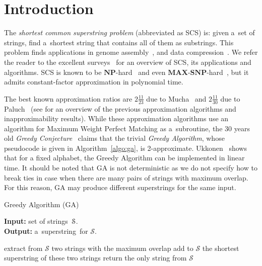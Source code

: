 \section{Introduction}
\label{sec:intro}
The {\em shortest common superstring problem} (abbreviated as SCS) is:
given a~set of strings, find a~shortest string that contains all of them as
substrings. This problem finds applications in genome assembly~\cite{waterman1995introduction, pevzner2001eulerian}, and data compression~\cite{GMS1980, phdthesis, storer1987data}. We refer the reader to the excellent surveys~\cite{gevezes2014shortest, mucha2007tutorial} for an overview of SCS, its applications and algorithms.  SCS is known to be $\mathbf{NP}$-hard~\cite{GMS1980} and even $\mathbf{MAX}$-$\mathbf{SNP}$-hard~\cite{BJLTY1991}, but it admits constant-factor approximation in polynomial time.

The best known approximation ratios are $2\frac{11}{23}$ due to Mucha~\cite{M2013} 
and $2\frac{11}{30}$ due to Paluch~\cite{P14} 
(see \cite[Section~2.1]{GKM13} for an overview of the 
previous approximation algorithms
and inapproximability results). While these approximation algorithms use an algorithm for Maximum Weight Perfect Matching as a~subroutine, the $30$ years old \emph{Greedy Conjecture}~\cite{storer1987data, TU1988, T1989, BJLTY1991} claims that the trivial \emph{Greedy Algorithm}, whose pseudocode is given in Algorithm~\ref{algo:ga}, is 2-approximate. Ukkonen~\cite{ukkonen1990linear} shows that for a fixed alphabet, the Greedy Algorithm can be implemented in linear time. It should be noted that GA is not deterministic as we do not specify how to break ties in case when there are many pairs of strings with maximum overlap. For this reason, GA may produce different superstrings for the same input.


\begin{algorithm}[ht]
\caption{Greedy Algorithm (GA)}\label{algo:ga}
\hspace*{\algorithmicindent} \textbf{Input:} set of strings~${\cal S}$.\\
\hspace*{\algorithmicindent} \textbf{Output:} a~superstring~for $\mathcal{S}$.
\begin{algorithmic}[1]
\State extract from $\mathcal{S}$ two strings with the maximum overlap
\State add to $\mathcal{S}$ the shortest superstring of these two strings
\EndWhile
\State return the only string from $\mathcal{S}$
\end{algorithmic}
\end{algorithm}

